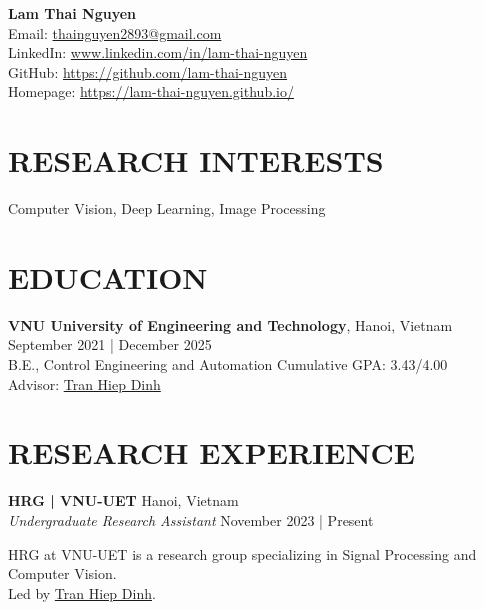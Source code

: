 \documentclass[a4paper,9pt]{extarticle}
\begin{document}
\pagestyle{fancy}
\renewcommand{\headrulewidth}{0pt}
\fancyhead{}
\fancyhead[R]{\textit{\today}}
\thispagestyle{empty} %

\begin{flushleft}
\textbf{\LARGE Lam Thai Nguyen}\\[2pt] %
Email: \href{mailto:thainguyen2893@gmail.com}{thainguyen2893@gmail.com} \\
LinkedIn: \href{https://www.linkedin.com/in/lam-thai-nguyen}{www.linkedin.com/in/lam-thai-nguyen} \\
GitHub: \href{https://github.com/lam-thai-nguyen}{https://github.com/lam-thai-nguyen}\\
Homepage: \href{https://lam-thai-nguyen.github.io/}{https://lam-thai-nguyen.github.io/}
\end{flushleft}

\section*{RESEARCH INTERESTS}
\noindent
Computer Vision, Deep Learning, Image Processing

\section*{EDUCATION}
\noindent
\textbf{VNU University of Engineering and Technology}, Hanoi, Vietnam \hfill September 2021 | December 2025\\ %
B.E., Control Engineering and Automation \hfill Cumulative GPA: 3.43/4.00 \\
Advisor: \href{https://scholar.google.com/citations?user=fJYX_zsAAAAJ&hl=en&oi=ao}{Tran Hiep Dinh} \\

\section*{RESEARCH EXPERIENCE}
\noindent
\textbf{HRG | VNU-UET} \hfill Hanoi, Vietnam  \\ %
\textit{Undergraduate Research Assistant} \hfill November 2023 | Present %

\vspace{3pt}\noindent
HRG at VNU-UET is a research group specializing in Signal Processing and Computer Vision. \\ 
Led by \href{https://scholar.google.com/citations?user=fJYX_zsAAAAJ&hl=en&oi=ao}{Tran Hiep Dinh}.
\end{document}

